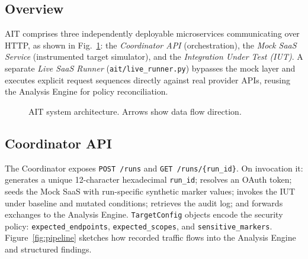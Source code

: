 \documentclass[conference]{IEEEtran}
\begin{document}
\subsection{Overview}

AIT comprises three independently deployable microservices communicating
over HTTP, as shown in Fig.~\ref{fig:arch}: the \emph{Coordinator API}
(orchestration), the \emph{Mock SaaS Service} (instrumented target
simulator), and the \emph{Integration Under Test (IUT)}. A separate
\emph{Live SaaS Runner} (\texttt{ait/live\_runner.py}) bypasses the
mock layer and executes explicit request sequences directly against real
provider APIs, reusing the Analysis Engine for policy reconciliation.

\begin{figure}[htbp]
  \centering
  \caption{AIT system architecture. Arrows show data flow direction.}
  \label{fig:arch}
\end{figure}

\subsection{Coordinator API}

The Coordinator exposes \texttt{POST /runs} and
\texttt{GET /runs/\{run\_id\}}. On invocation it: generates a unique
12-character hexadecimal \texttt{run\_id}; resolves an OAuth token;
seeds the Mock SaaS with run-specific synthetic marker values; invokes the IUT under baseline
and mutated conditions; retrieves the audit log; and forwards
exchanges to the Analysis Engine. \texttt{TargetConfig} objects
encode the security policy: \texttt{expected\_endpoints},
\texttt{expected\_scopes}, and \texttt{sensitive\_markers}.
Figure~\ref{fig:pipeline} sketches how recorded traffic flows into the
Analysis Engine and structured findings.
\end{document}
